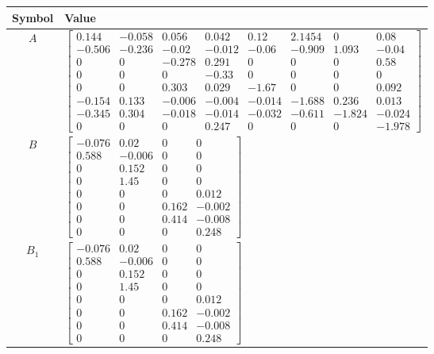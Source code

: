 \begin{tabular}{cl}
\hline
  Symbol  & Value                                                                                                                                                                                                                                                                                                                                                                                                                                                                                \\
\hline
   $A$    & $\left[\begin{matrix}0.144 & -0.058 & 0.056 & 0.042 & 0.12 & 2.1454 & 0 & 0.08\\-0.506 & -0.236 & -0.02 & -0.012 & -0.06 & -0.909 & 1.093 & -0.04\\0 & 0 & -0.278 & 0.291 & 0 & 0 & 0 & 0.58\\0 & 0 & 0 & -0.33 & 0 & 0 & 0 & 0\\0 & 0 & 0.303 & 0.029 & -1.67 & 0 & 0 & 0.092\\-0.154 & 0.133 & -0.006 & -0.004 & -0.014 & -1.688 & 0.236 & 0.013\\-0.345 & 0.304 & -0.018 & -0.014 & -0.032 & -0.611 & -1.824 & -0.024\\0 & 0 & 0 & 0.247 & 0 & 0 & 0 & -1.978\end{matrix}\right]$ \\
   $B$    & $\left[\begin{matrix}-0.076 & 0.02 & 0 & 0\\0.588 & -0.006 & 0 & 0\\0 & 0.152 & 0 & 0\\0 & 1.45 & 0 & 0\\0 & 0 & 0 & 0.012\\0 & 0 & 0.162 & -0.002\\0 & 0 & 0.414 & -0.008\\0 & 0 & 0 & 0.248\end{matrix}\right]$                                                                                                                                                                                                                                                                    \\
 $B_{1}$  & $\left[\begin{matrix}-0.076 & 0.02 & 0 & 0\\0.588 & -0.006 & 0 & 0\\0 & 0.152 & 0 & 0\\0 & 1.45 & 0 & 0\\0 & 0 & 0 & 0.012\\0 & 0 & 0.162 & -0.002\\0 & 0 & 0.414 & -0.008\\0 & 0 & 0 & 0.248\end{matrix}\right]$                                                                                                                                                                                                                                                                    \\

\end{tabular}
